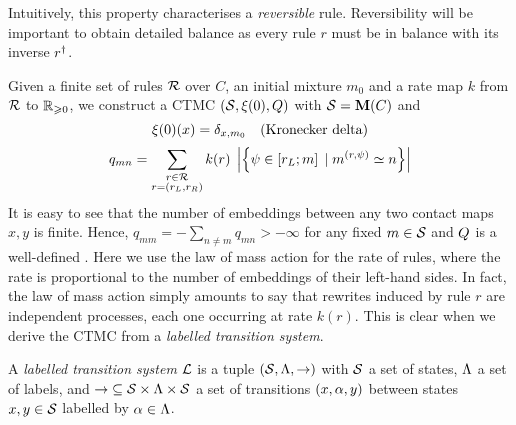 Intuitively, this property characterises a \emph{reversible} rule.
Reversibility will be important to obtain detailed balance as
every rule $r$ must be in balance with its inverse $r^\dagger$.

Given a finite set of rules $\mathcal{R}$ over $C$,
an initial mixture $m_0$
and a rate map $k$ from $\mathcal{R}$ to $\mathbb{R}_{\geqslant 0}$,
we construct a CTMC $\left(\mathcal{S}, \xi(0), Q\right)$ %
with $\mathcal{S} = \mathbf{M}(C)$ and
\[ \xi(0)(x) = \delta_{x,m_0} \quad\text{(Kronecker delta)} \]
\begin{equation}
  \label{eq:kappa-ctmc}
  q_{mn} = \sum_{\substack{r \in \mathcal{R}\\r = \left(r_L,r_R\right)}}
    k(r) \; \left\lvert \left\{ \psi \in \left[r_L;m\right] \; | \; 
      m^{(r,\psi)} \simeq n \right\} \right\rvert
\end{equation}
It is easy to see that the number of embeddings
between any two contact maps $x,y$ is finite.
Hence, $q_{mm} = -\sum_{n \neq m} q_{mn} > -\infty$
for any fixed $m \in \mathcal{S}$
and $Q$ is a well-defined \qmatrix.
Here we use the law of mass action for the rate of rules,
where the rate is proportional to the number of embeddings %
of their left-hand sides. %
In fact, the law of mass action simply amounts to say that
rewrites induced by rule $r$ are independent processes,
each one occurring at rate $k(r)$.
This is clear when we derive the CTMC from
a \emph{labelled transition system}. %

\begin{definition}
  A \emph{labelled transition system} $\mathcal{L}$ is a tuple
  $\left(\mathcal{S},\Lambda,\to\right)$ with
  $\mathcal{S}$ a set of states,
  $\Lambda$ a set of labels,
  and $\to\; \subseteq \mathcal{S} \times \Lambda \times \mathcal{S}$
  a set of transitions $\left(x,\alpha,y\right)$
  between states $x,y \in \mathcal{S}$
  labelled by $\alpha \in \Lambda$.
\end{definition}


